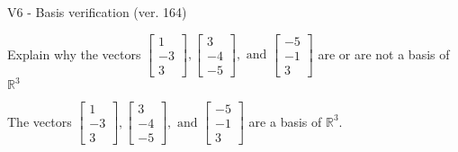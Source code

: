 \begin{exercise}
  \begin{exerciseTitle}V6 - Basis verification (ver. 164)\end{exerciseTitle}
  \begin{exerciseStatement}
    Explain why the vectors \(\left[\begin{array}{r}
1 \\
-3 \\
3
\end{array}\right] , \left[\begin{array}{r}
3 \\
-4 \\
-5
\end{array}\right] , \text{ and } \left[\begin{array}{r}
-5 \\
-1 \\
3
\end{array}\right]\) are or are not a basis of \(\mathbb{R}^3\)	


  \end{exerciseStatement}
  \begin{exerciseAnswer}
   The vectors \(\left[\begin{array}{r}
1 \\
-3 \\
3
\end{array}\right] , \left[\begin{array}{r}
3 \\
-4 \\
-5
\end{array}\right] , \text{ and } \left[\begin{array}{r}
-5 \\
-1 \\
3
\end{array}\right]\) 
  	 are  a basis of \(\mathbb{R}^3\).
  


  \end{exerciseAnswer}
\end{exercise}